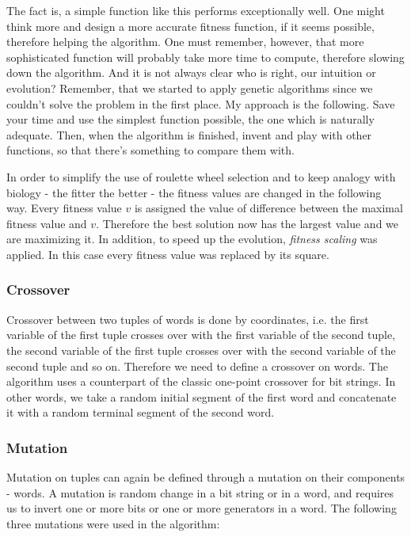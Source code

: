 \documentclass{article}
\begin{document}
The fact is, a simple function like this performs exceptionally
well. One might think more and design a more accurate fitness
function, if it seems possible, therefore helping the algorithm. One
must remember, however, that more sophisticated function will probably
take more time to compute, therefore slowing down the algorithm. And
it is not always clear who is right, our intuition or evolution?
Remember, that we started to apply genetic algorithms since we
couldn't solve the problem in the first place. My approach is the
following. Save your time and use the simplest function possible, the
one which is naturally adequate. Then, when the algorithm is finished,
invent and play with other functions, so that there's something to
compare them with.

In order to simplify the use of roulette wheel selection and to keep
analogy with biology - the fitter the better - the fitness values are
changed in the following way. Every fitness value $v$ is assigned the
value of difference between the maximal fitness value and
$v$. Therefore the best solution now has the largest value and we are
maximizing it. In addition, to speed up the evolution, {\em fitness
scaling} was applied. In this case every fitness value was replaced by
its square.

    \subsubsection{Crossover}

Crossover between two tuples of words is done by coordinates,
i.e. the first variable of the first tuple crosses over with the
first variable of the second tuple, the second variable of the first
tuple crosses over with the second variable of the second tuple and
so on. Therefore we need to define a crossover on words. The algorithm
uses a counterpart of the classic one-point crossover for bit
strings. In other words, we take a random initial segment of the first
word and concatenate it with a random terminal segment of the second
word.

    \subsubsection{Mutation}

Mutation on tuples can again be defined through a mutation on their
components - words. A mutation is random change in a bit string or in
a word, and requires us to invert one or more bits or one or more
generators in a word. The following three mutations were used in the
algorithm:
\end{document}
